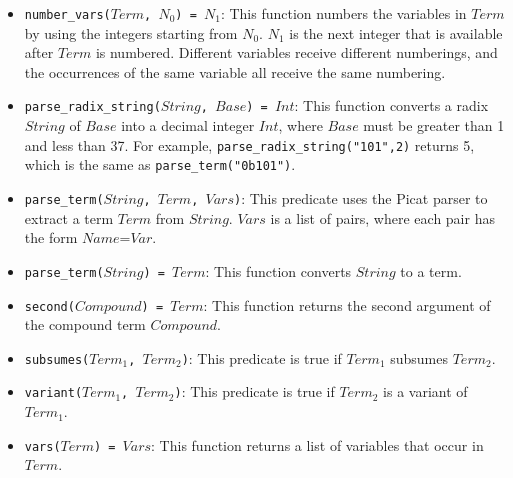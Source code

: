 \begin{itemize}
\item \texttt{number\_vars($Term$, $N_0$) = $N_1$}: This function numbers the variables in $Term$ by using the integers starting from $N_0$.  $N_1$ is the next integer that is available after $Term$ is numbered.  Different variables receive different numberings, and the occurrences of the same variable all receive the same numbering.
\item \texttt{parse\_radix\_string($String$, $Base$) = $Int$}: This function converts a radix $String$ of $Base$ into a decimal integer $Int$, where $Base$ must be greater than 1 and less than 37. For example, \texttt{parse\_radix\_string("101",2)} returns 5, which is the same as \texttt{parse\_term("0b101")}.
\item \texttt{parse\_term($String$, $Term$, $Vars$)}: This predicate uses the Picat parser to extract a term $Term$ from $String$. $Vars$ is a list of pairs, where each pair has the form $Name$=$Var$. 
\item \texttt{parse\_term($String$) = $Term$}: This function converts $String$ to a term.
\item \texttt{second($Compound$) = $Term$}: This function returns the second argument of the compound term $Compound$.  
\item \texttt{subsumes($Term_1$, $Term_2$)}: This predicate is true if $Term_1$ subsumes $Term_2$.
\item \texttt{variant($Term_1$, $Term_2$)}: This predicate is true if $Term_2$ is a variant of $Term_1$.
\item \texttt{vars($Term$) = $Vars$}: This function returns a list of variables that occur in $Term$.
\end{itemize}
\ignore{

}
